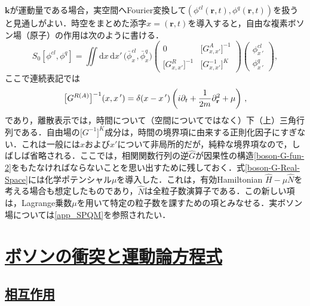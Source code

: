 \documentclass[a4paper,11pt]{ltjsarticle}
\newcommand{\sectionlink}[1]{\section[#1]{\hyperlink{toc}{#1}}}
\newcommand{\subsectionlink}[1]{\subsection[#1]{\hyperlink{toc}{#1}}}
\def\d{\mathrm{d}}
\begin{document}
$\mathbf{k}$が運動量である場合，実空間へFourier変換して$(\phi^{cl}(\mathbf{r},t), \phi^q(\mathbf{r},t))$を扱うと見通しがよい．時空をまとめた添字$x=(\mathbf{r},t)$を導入すると，自由な複素ボソン場（原子）の作用は次のように書ける．
\begin{equation}\label{boson-S-2}
S_{0}[\phi^{cl},\phi^{q}] = \iint\d x\,\d
x'\,\big(\bar\phi^{cl}_x,\bar\phi^{q}_x\big) \left(\begin{array}{cc}
0   & \big[G^{A}_{x,x'}\big]^{-1}  \\
  \big[G^{R}_{x,x'}\big]^{-1}  & \big[G^{-1}_{x,x'}\big]^K
\end{array}\right)
\left(\begin{array}{c} \phi^{cl}_{x\,'} \\ \phi^{q}_{x\,'}
\end{array}\right),
\end{equation}ここで連続表記では
\begin{equation}\label{boson-G-Real-Space}
\big[G^{R(A)}\big]^{-1}(x,x\,')=\delta(x-x\,')\left( i\partial_{t}
+{1\over 2m}
\partial_{\mathbf{r}}^2 +\mu\right)\, ,
\end{equation}であり，離散表示では，時間について（空間についてではなく）下（上）三角行列である．自由場の$\big[G^{-1}\big]^K$成分は，時間の境界項に由来する正則化因子にすぎない．これは一般には$x$および$x'$について非局所的だが，純粋な境界項なので，しばしば省略される．ここでは，相関関数行列の逆$\hat{G}$が因果性の構造\eqref{boson-G-fun-2}をもたなければならないことを思い出すために残しておく．式\eqref{boson-G-Real-Space}には化学ポテンシャル$\mu$を導入した．これは，有効Hamiltonian $\hat{H}-\mu\hat{N}$を考える場合も想定したものであり，$\hat{N}$は全粒子数演算子である．この新しい項は，Lagrange乗数$\mu$を用いて特定の粒子数を課すための項とみなせる．実ボソン場については\ref{app_SPQM}を参照されたい．


\sectionlink{ボソンの衝突と運動論方程式}\label{sec_int_bos}
\subsectionlink{相互作用}\label{sec_int_bos-1}
\end{document}
